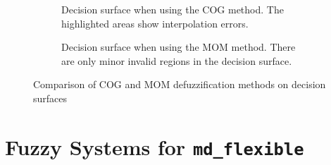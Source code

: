 \begin{figure}[H]
\begin{subfigure}[t]{0.45\textwidth}
        \caption[Decision surface of the fuzzy rules using COG method]{Decision surface when using the COG method. The highlighted areas show interpolation errors.}
        \label{fig:fuzzyDecisionSurfaceExampleCOG}
    \end{subfigure}
    \hfill
    \begin{subfigure}[t]{0.45\textwidth}
        \centering
        \caption[Decision surface of the fuzzy rules using MOM method]{Decision surface when using the MOM method. There are only minor invalid regions in the decision surface.}
        \label{fig:fuzzyDecisionSurfaceExampleMOM}
    \end{subfigure}
    \caption{Comparison of COG and MOM defuzzification methods on decision surfaces}
    \label{fig:fuzzyDecisionSurfaceComparison}
\end{figure}


\section{Fuzzy Systems for \texttt{md\_flexible}}

